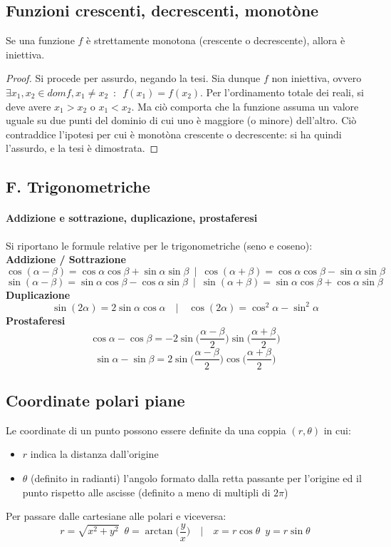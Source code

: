 \documentclass[10pt]{article}
\theoremstyle{plain}
\begin{document}
\subsection{Funzioni crescenti, decrescenti, monotòne}
\begin{prop}
Se una funzione $f$ è strettamente monotona (crescente o decrescente), allora è iniettiva.
\end{prop}
\begin{proof}
Si procede per assurdo, negando la tesi. Sia dunque $f$ non iniettiva, ovvero $\exists x_1, x_2 \in domf, x_1 \neq x_2 \enspace : \enspace f(x_1) = f(x_2)$. Per l'ordinamento totale dei reali, si deve avere $x_1 > x_2$ o $x_1 < x_2$. Ma ciò comporta che la funzione assuma un valore uguale su due punti del dominio di cui uno è maggiore (o minore) dell'altro. Ciò contraddice l'ipotesi per cui è monotòna crescente o decrescente: si ha quindi l'assurdo, e la tesi è dimostrata.
\end{proof}

\subsection{F. Trigonometriche}
\paragraph{Addizione e sottrazione, duplicazione, prostaferesi}
Si riportano le formule relative per le trigonometriche (seno e coseno):
\textbf{Addizione / Sottrazione}
\[\cos(\alpha - \beta) = \cos \alpha \cos \beta + \sin \alpha \sin \beta \enspace | \enspace \cos(\alpha + \beta) = \cos \alpha \cos \beta - \sin \alpha \sin \beta\]
\[\sin(\alpha - \beta) = \sin \alpha \cos \beta - \cos \alpha \sin \beta \enspace | \enspace \sin(\alpha + \beta) = \sin \alpha \cos \beta + \cos \alpha \sin \beta\]
\textbf{Duplicazione}
\[\sin (2\alpha) = 2 \sin \alpha \cos \alpha \quad \bigg| \quad \cos (2\alpha) = \cos^2\alpha - \sin^2 \alpha\]
\textbf{Prostaferesi}
\[\cos \alpha - \cos \beta = -2 \sin \big(\frac{\alpha - \beta}{2}\big)\sin\big(\frac{\alpha + \beta}{2}\big)\]
\[\sin \alpha - \sin \beta = 2 \sin \big(\frac{\alpha - \beta}{2}\big)\cos\big(\frac{\alpha + \beta}{2}\big)\]

\subsection{Coordinate polari piane}
Le coordinate di un punto possono essere definite da una coppia $(r, \theta)$ in cui:
\begin{itemize}
    \item $r$ indica la distanza dall'origine
    \item $\theta$ (definito in radianti) l'angolo formato dalla retta passante per l'origine ed il punto rispetto alle ascisse (definito a meno di multipli di $2\pi$)
\end{itemize}
Per passare dalle cartesiane alle polari e viceversa:
\[r = \sqrt{x^2 + y^2} \enspace \theta = \arctan\bigg( \frac{y}{x} \bigg) \quad \bigg| \quad x = r \cos \theta \enspace y = r \sin \theta\]
\end{document}
